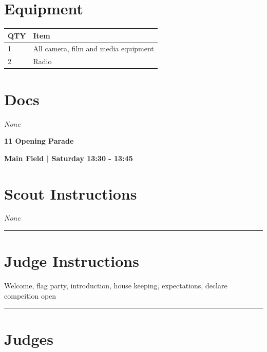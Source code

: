 \documentclass[10pt]{article}
\newcommand{\newtitle}[1]{\begin{center}{\Huge\bfseries #1 }\\ \vspace{5mm}\end{center}}
\newcommand{\newsubtitle}[1]{\begin{center}{\color{grey}\Large\bfseries #1 }\\ \vspace{5mm}\end{center}}
\begin{document}
	\begin{multicols}{2}

		\section*{\faWrench \: Equipment}

		
	\begin{center}
			\begin{tabular}{p{2cm}p{4cm}}


				\textbf{QTY} & \textbf{Item} \\\toprule
												1&All camera, film and media equipment\\\midrule
												2&Radio\\\midrule
								\end{tabular}

			\end{center}

		
		\vfill\null
		\columnbreak

			\section*{\faFile \: Docs}
		 	\textit{None}
	

		\vfill\null

		\end{multicols}



	\vspace{1cm}


	\clearpage
		\newtitle{11 Opening Parade }
	\newsubtitle{Main Field | Saturday 13:30 - 13:45}
		\setcounter{section}{10}
	\section*{Scout Instructions}
		\textit{None}
	
	\vspace{0.5cm}
	\hrule
	\vspace{0.5cm}

		\section*{Judge Instructions}
		Welcome, flag party, introduction, house keeping, expectations, declare compeition open
\vspace{0.5cm}
	\hrule
	\vspace{0.5cm}
		\section*{\faUsers \: Judges}
\end{document}
